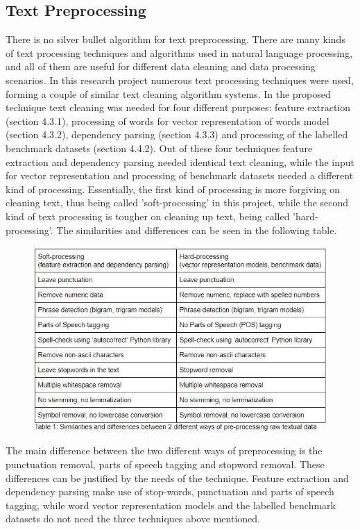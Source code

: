 \documentclass{sig-alternate}
\begin{document}
\subsection{Text Preprocessing}
There is no silver bullet algorithm for text preprocessing. There are many kinds of text processing techniques and algorithms used in natural language processing, and all of them are useful for different data cleaning and data processing scenarios. In this research project numerous text processing techniques were used, forming a couple of similar text cleaning algorithm systems. 
In the proposed technique text cleaning was needed for four different purposes: feature extraction (section 4.3.1), processing of words for vector representation of words model (section 4.3.2), dependency parsing (section 4.3.3) and processing of the labelled benchmark datasets (section 4.4.2). Out of these four techniques feature extraction and dependency parsing needed identical text cleaning, while the input for vector representation and processing of benchmark datasets needed a different kind of processing. Essentially, the first kind of processing is more forgiving on cleaning text, thus being called 'soft-processing' in this project, while the second kind of text processing is tougher on cleaning up text, being called 'hard-processing'. The similarities and differences can be seen in the following table.

\begin{figure}
\centering
\includegraphics[scale=0.65]{images/text_processing_table.JPG}
\end{figure}

The main difference between the two different ways of preprocessing is the punctuation removal, parts of speech tagging and stopword removal. These differences can be justified by the needs of the technique. Feature extraction and dependency parsing make use of stop-words, punctuation and parts of speech tagging, while word vector representation models and the labelled benchmark datasets do not need the three techniques above mentioned.
\end{document}
